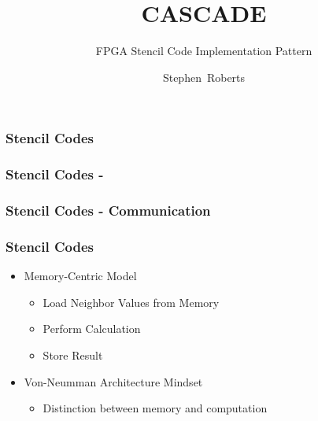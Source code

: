 \documentclass[draft]{beamer}
\title{CASCADE}
\subtitle{FPGA Stencil Code Implementation Pattern}
\author{Stephen~Roberts}
\institute{The University Of Warwick}
\begin{document}
  \frame{\titlepage}
  \begin{frame}
    \frametitle{Stencil Codes}
    \begin{figure}
      \centering
      
    \end{figure}
  \end{frame}

  \begin{frame}
    \frametitle{Stencil Codes - }
    \begin{figure}
      \centering
      
    \end{figure}
  \end{frame}

  \begin{frame}
    \frametitle{Stencil Codes - Communication}
    \begin{figure}
      \centering
      
    \end{figure}
  \end{frame}

  \begin{frame}
    \frametitle{Stencil Codes}
    \begin{itemize}
      \item<1->{Memory-Centric Model}
        \begin{itemize}
          \item{Load Neighbor Values from Memory}
          \item{Perform Calculation}
          \item{Store Result}
        \end{itemize}
      \item<2->{Von-Neumman Architecture Mindset}
        \begin{itemize}
          \item{Distinction between memory and computation}
        \end{itemize}

    \end{itemize}
  \end{frame}

  
 
\end{document}

